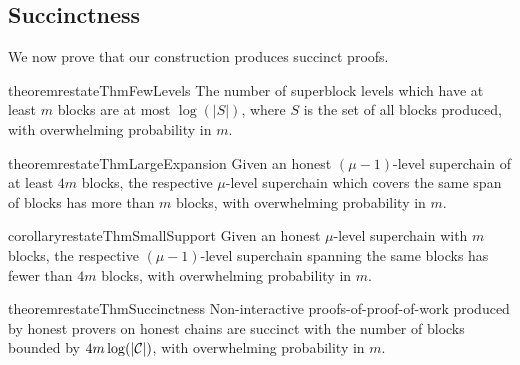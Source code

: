 \subsection{Succinctness}

We now prove that our construction produces succinct proofs.

\begin{restatable}{theorem}{restateThmFewLevels}
    \label{thm.few-levels}
    The number of superblock levels which have at least $m$ blocks are at most
    $\log(|S|)$, where $S$ is the set of all blocks produced, with overwhelming
    probability in $m$.
\end{restatable}

\begin{restatable}{theorem}{restateThmLargeExpansion}
    \label{thm.large-expansion}
    Given an honest $(\mu - 1)$-level superchain of at least $4m$ blocks,
    the respective $\mu$-level
    superchain which covers the same span of blocks has more than $m$ blocks,
    with overwhelming probability in $m$.
\end{restatable}

\begin{restatable}{corollary}{restateThmSmallSupport}
    \label{crly.small-support}
    Given an honest $\mu$-level superchain with $m$ blocks, the respective
    $(\mu - 1)$-level superchain spanning the same blocks has fewer than $4m$
    blocks, with overwhelming probability in $m$.
\end{restatable}

\begin{restatable}{theorem}{restateThmSuccinctness}
    \label{thm.succinctness}
    Non-interactive proofs-of-proof-of-work produced by honest provers on
    honest chains are succinct with the number of blocks bounded by $4m
    \log(|\mathcal{C}|)$, with overwhelming probability in $m$.
\end{restatable}

